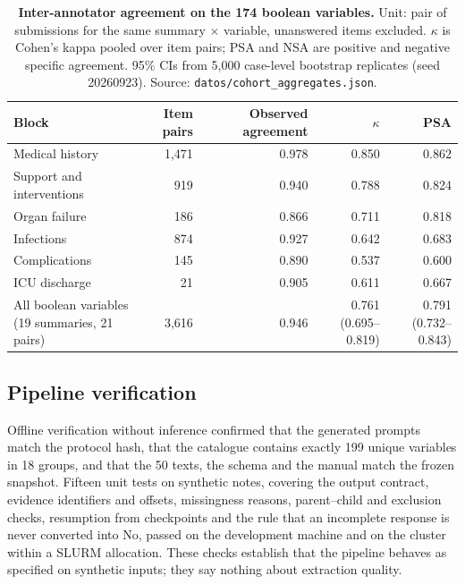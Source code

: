 \begin{table}[tbp]
\centering\small
\caption{\textbf{Inter-annotator agreement on the 174 boolean variables.} Unit: pair of submissions for the
same summary $\times$ variable, unanswered items excluded. $\kappa$ is Cohen's kappa pooled over item pairs;
PSA and NSA are positive and negative specific agreement. 95\% CIs from 5{,}000 case-level bootstrap
replicates (seed 20260923). Source: \texttt{datos/cohort\_aggregates.json}.}
\label{tab:iaa}
\begin{tabular}{lrrrr}
\toprule
Block & Item pairs & Observed agreement & $\kappa$ & PSA \\
\midrule
Medical history & 1{,}471 & 0.978 & 0.850 & 0.862 \\
Support and interventions & 919 & 0.940 & 0.788 & 0.824 \\
Organ failure & 186 & 0.866 & 0.711 & 0.818 \\
Infections & 874 & 0.927 & 0.642 & 0.683 \\
Complications & 145 & 0.890 & 0.537 & 0.600 \\
ICU discharge & 21 & 0.905 & 0.611 & 0.667 \\
\midrule
\makecell[l]{All boolean variables\\(19 summaries, 21 pairs)} & 3{,}616 & 0.946 & \makecell[r]{0.761\\(0.695--0.819)} & \makecell[r]{0.791\\(0.732--0.843)} \\
\bottomrule
\end{tabular}
\end{table}

\subsection{Pipeline verification}

Offline verification without inference confirmed that the generated prompts match the protocol hash, that
the catalogue contains exactly 199 unique variables in 18 groups, and that the 50 texts, the schema and the
manual match the frozen snapshot. Fifteen unit tests on synthetic notes, covering the output contract, evidence
identifiers and offsets, missingness reasons, parent--child and exclusion checks, resumption from checkpoints and
the rule that an incomplete response is never converted into No,
passed on the development machine and on the cluster within a SLURM allocation. These checks establish that
the pipeline behaves as specified on synthetic inputs; they say nothing about extraction quality.

